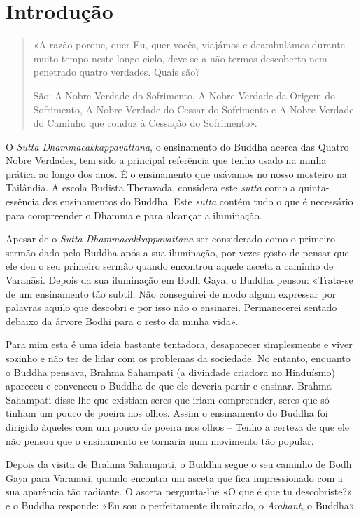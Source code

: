 \chapter{Introdução}

\begin{quote}
  «A razão porque, quer Eu, quer vocês, viajámos e deambulámos durante muito
  tempo neste longo ciclo, deve-se a não termos descoberto nem penetrado quatro
  verdades. Quais são?

  São: A Nobre Verdade do Sofrimento, A Nobre Verdade da Origem do Sofrimento, A
  Nobre Verdade do Cessar do Sofrimento e A Nobre Verdade do Caminho que conduz
  à Cessação do Sofrimento».

\end{quote}

O \emph{Sutta Dhammacakkappavattana}, o ensinamento do Buddha acerca das Quatro
Nobre Verdades, tem sido a principal referência que tenho usado na minha prática
ao longo dos anos. É o ensinamento que usávamos no nosso mosteiro na Tailândia.
A escola Budista Theravada, considera este \emph{sutta} como a quinta-essência
dos ensinamentos do Buddha. Este \emph{sutta} contém tudo o que é necessário
para compreender o Dhamma e para alcançar a iluminação.

Apesar de o \emph{Sutta Dhammacakkappavattana} ser considerado como o primeiro
sermão dado pelo Buddha após a sua iluminação, por vezes gosto de pensar que ele
deu o seu primeiro sermão quando encontrou aquele asceta a caminho de Varanāsi.
Depois da sua iluminação em Bodh Gaya, o Buddha pensou: «Trata-se de um
ensinamento tão subtil. Não conseguirei de modo algum expressar por palavras
aquilo que descobri e por isso não o ensinarei. Permanecerei sentado debaixo da
árvore Bodhi para o resto da minha vida».

Para mim esta é uma ideia bastante tentadora, desaparecer simplesmente e viver
sozinho e não ter de lidar com os problemas da sociedade. No entanto, enquanto o
Buddha pensava, Brahma Sahampati (a divindade criadora no Hinduísmo) apareceu e
convenceu o Buddha de que ele deveria partir e ensinar. Brahma Sahampati
disse-lhe que existiam seres que iriam compreender, seres que só tinham um pouco
de poeira nos olhos. Assim o ensinamento do Buddha foi dirigido àqueles com um
pouco de poeira nos olhos – Tenho a certeza de que ele não pensou que o
ensinamento se tornaria num movimento tão popular.

Depois da visita de Brahma Sahampati, o Buddha segue o seu caminho de Bodh Gaya
para Varanāsi, quando encontra um asceta que fica impressionado com a sua
aparência tão radiante. O asceta pergunta-lhe «O que é que tu descobriste?» e o
Buddha responde: «Eu sou o perfeitamente iluminado, o \emph{Arahant}, o Buddha».

